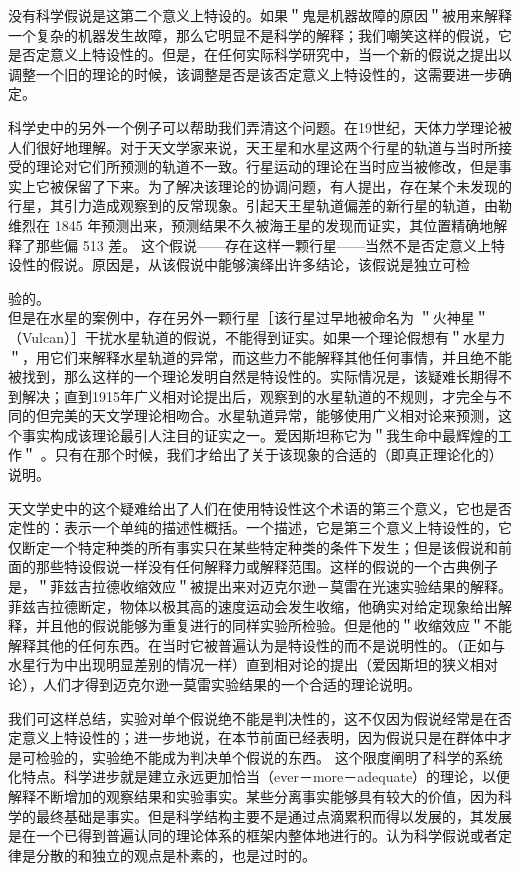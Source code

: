 没有科学假说是这第二个意义上特设的。如果＂鬼是机器故障的原因＂被用来解释一个复杂的机器发生故障，那么它明显不是科学的解释；我们嘲笑这样的假说，它是否定意义上特设性的。但是，在任何实际科学研究中，当一个新的假说之提出以调整一个旧的理论的时候，该调整是否是该否定意义上特设性的，这需要进一步确定。

科学史中的另外一个例子可以帮助我们弄清这个问题。在19世纪，天体力学理论被人们很好地理解。对于天文学家来说，天王星和水星这两个行星的轨道与当时所接受的理论对它们所预测的轨道不一致。行星运动的理论在当时应当被修改，但是事实上它被保留了下来。为了解决该理论的协调问题，有人提出，存在某个未发现的行星，其引力造成观察到的反常现象。引起天王星轨道偏差的新行星的轨道，由勒维烈在 1845 年预测出来，预测结果不久被海王星的发现而证实，其位置精确地解释了那些偏 513 差。\cite{leverrier1992} 这个假说——存在这样一颗行星——当然不是否定意义上特设性的假说。原因是，从该假说中能够演绎出许多结论，该假说是独立可检

验的。\\
但是在水星的案例中，存在另外一颗行星［该行星过早地被命名为 ＂火神星＂（Vulcan）］干扰水星轨道的假说，不能得到证实。如果一个理论假想有＂水星力＂，用它们来解释水星轨道的异常，而这些力不能解释其他任何事情，并且绝不能被找到，那么这样的一个理论发明自然是特设性的。实际情况是，该疑难长期得不到解决；直到1915年广义相对论提出后，观察到的水星轨道的不规则，才完全与不同的但完美的天文学理论相吻合。水星轨道异常，能够使用广义相对论来预测，这个事实构成该理论最引人注目的证实之一。爱因斯坦称它为＂我生命中最辉煌的工作＂\cite{einstein1915} 。只有在那个时候，我们才给出了关于该现象的合适的（即真正理论化的）说明。

天文学史中的这个疑难给出了人们在使用特设性这个术语的第三个意义，它也是否定性的：表示一个单纯的描述性概括。一个描述，它是第三个意义上特设性的，它仅断定一个特定种类的所有事实只在某些特定种类的条件下发生；但是该假说和前面的那些特设假说一样没有任何解释力或解释范围。这样的假说的一个古典例子是，＂菲兹吉拉德收缩效应＂被提出来对迈克尔逊－莫雷在光速实验结果的解释。菲兹吉拉德断定，物体以极其高的速度运动会发生收缩，他确实对给定现象给出解释，并且他的假说能够为重复进行的同样实验所检验。但是他的＂收缩效应＂不能解释其他的任何东西。在当时它被普遍认为是特设性的而不是说明性的。（正如与水星行为中出现明显差别的情况一样）直到相对论的提出（爱因斯坦的狭义相对论），人们才得到迈克尔逊一莫雷实验结果的一个合适的理论说明。

我们可这样总结，实验对单个假说绝不能是判决性的，这不仅因为假说经常是在否定意义上特设性的；进一步地说，在本节前面已经表明，因为假说只是在群体中才是可检验的，实验绝不能成为判决单个假说的东西。\cite{popper1963} 这个限度阐明了科学的系统化特点。科学进步就是建立永远更加恰当（ever－more－adequate）的理论，以便解释不断增加的观察结果和实验事实。某些分离事实能够具有较大的价值，因为科学的最终基础是事实。但是科学结构主要不是通过点滴累积而得以发展的，其发展是在一个已得到普遍认同的理论体系的框架内整体地进行的。认为科学假说或者定律是分散的和独立的观点是朴素的，也是过时的。


